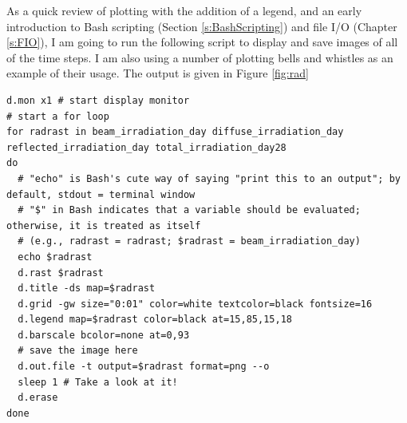 \documentclass{book}
\begin{document}
As a quick review of plotting with the addition of a legend, and an early introduction to Bash scripting (Section \ref{s:BashScripting}) and file I/O (Chapter \ref{s:FIO}), I am going to run the following script to display and save images of all of the time steps. I am also using a number of plotting bells and whistles as an example of their usage. The output is given in Figure \ref{fig:rad}

\begin{lstlisting}
d.mon x1 # start display monitor
# start a for loop
for radrast in beam_irradiation_day diffuse_irradiation_day reflected_irradiation_day total_irradiation_day28
do
  # "echo" is Bash's cute way of saying "print this to an output"; by default, stdout = terminal window
  # "$" in Bash indicates that a variable should be evaluated; otherwise, it is treated as itself
  # (e.g., radrast = radrast; $radrast = beam_irradiation_day)
  echo $radrast
  d.rast $radrast
  d.title -ds map=$radrast
  d.grid -gw size="0:01" color=white textcolor=black fontsize=16
  d.legend map=$radrast color=black at=15,85,15,18
  d.barscale bcolor=none at=0,93
  # save the image here
  d.out.file -t output=$radrast format=png --o
  sleep 1 # Take a look at it!
  d.erase
done
\end{lstlisting}
\end{document}
